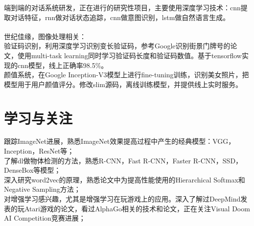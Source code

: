 \documentclass[11pt, a4paper]{article}
\begin{document}
端到端的对话系统研发，正在进行的研究性项目，主要使用深度学习技术：cnn提取对话特征，rnn做对话状态追踪，cnn做意图识别，lstm做自然语言生成。 \\
\\
世纪佳缘，图像处理相关： \\
验证码识别，利用深度学习识别变长验证码，参考Google识别街景门牌号的论文，使用multi-task learning同时学习验证码长度和验证码数值。基于tensorflow实现的cnn模型，线上正确率98.5\%。 \\
颜值系统，在Google Inception-V3模型上进行fine-tuning训练，识别美女照片，把模型用于用户颜值评分。修改slim源码，离线训练模型，并提供线上实时服务。 \\






\section*{学习与关注}

跟踪ImageNet进展，熟悉ImageNet效果提高过程中产生的经典模型：VGG，Inception，ResNet等； \\
了解dl做物体检测的方法，熟悉R-CNN，Fast R-CNN，Faster R-CNN，SSD，DenseBox等模型； \\
深入研究word2vec的原理，熟悉论文中为提高性能使用的Hierarchical Softmax和Negative Sampling方法； \\
对增强学习感兴趣，尤其是增强学习在玩游戏上的应用。深入了解过DeepMind发表的玩Atari游戏的论文，看过AlphaGo相关的技术和论文，正在关注Visual Doom AI Competition竞赛进展； \\






\end{document}
